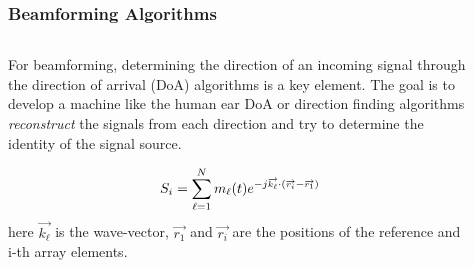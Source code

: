 \documentclass[10pt]{beamer}
\begin{document}
\begin{frame}
    \frametitle{Beamforming Algorithms}
    \begin{columns}[T]
        \begin{column}{.5\textwidth}
            \begin{outline}
                \small
                \1 For beamforming, determining the direction of an incoming signal through the direction of arrival (DoA) algorithms is a key element.
                \1 The goal is to develop a machine like the human ear
                \1 DoA or direction finding algorithms \textit{reconstruct} the signals from each direction and try to determine the identity of the signal source.
            \end{outline}
            \begin{align*}
                \small
                S_{i}=\sum_{\ell=1}^{N} m_{\ell}(t) e^{-j \overrightarrow{k_{\ell}} \cdot\left(\overrightarrow{r_{i}}-\overrightarrow{r_{1}}\right)}
            \end{align*}
            \tiny here $\overrightarrow{k_{\ell}}$ is the wave-vector, $\overrightarrow{r_{1}}$ and $\overrightarrow{r_{i}}$ are the positions of the reference and i-th array elements.
        \end{column}
        \begin{column}{.5\textwidth}
            \begin{figure}[T!]
                \centering
                 \\
            \end{figure}
        \end{column}
    \end{columns}
\end{frame}
\end{document}
